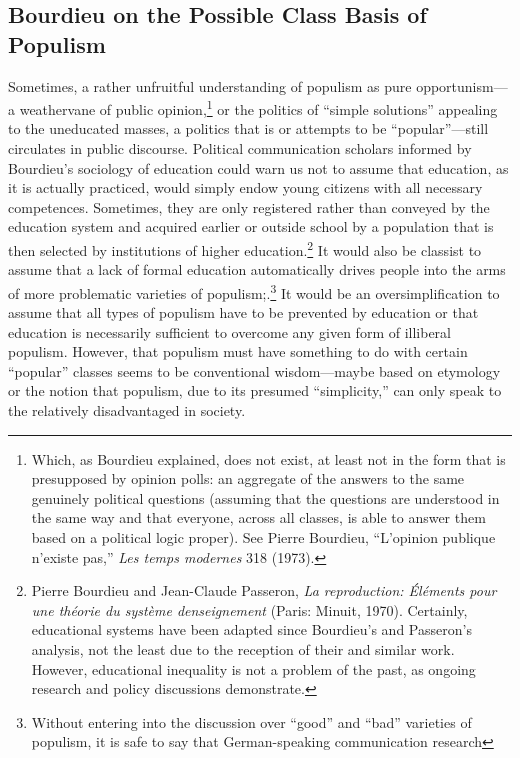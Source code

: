 \documentclass{tufte-handout}
\begin{document}
\hypertarget{bourdieu-on-the-possible-class-basis-of-populism}{%
\subsection{Bourdieu on the Possible Class
Basis of
Populism}\label{bourdieu-on-the-possible-class-basis-of-populism}}

Sometimes, a rather unfruitful understanding of populism as pure
opportunism---a weathervane of public opinion,\footnote{Which, as
  Bourdieu explained, does not exist, at least not in the form that is
  presupposed by opinion polls: an aggregate of the answers to the same
  genuinely political questions (assuming that the questions are
  understood in the same way and that everyone, across all classes, is
  able to answer them based on a political logic proper). See Pierre
  Bourdieu, ``L'opinion publique n'existe pas,'' \emph{Les temps
  modernes} 318 (1973).} or the politics of ``simple solutions''
appealing to the uneducated masses, a politics that is or attempts to be
``popular''---still circulates in public discourse. Political
communication scholars informed by Bourdieu's sociology of education
could warn us not to assume that education, as it is actually practiced,
would simply endow young citizens with all necessary competences.
Sometimes, they are only registered rather than conveyed by the
education system and acquired earlier or outside school by a population
that is then selected by institutions of higher education.\footnote{Pierre
  Bourdieu and Jean-Claude Passeron, \emph{La reproduction: Éléments
  pour une théorie du système d\textquotesingle enseignement} (Paris:
  Minuit, 1970). Certainly, educational systems have been adapted since
  Bourdieu's and Passeron's analysis, not the least due to the reception
  of their and similar work. However, educational inequality is not a
  problem of the past, as ongoing research and policy discussions
  demonstrate.} It would also be classist to assume that a lack of
formal education automatically drives people into the arms of more
problematic varieties of populism;.\footnote{Without entering into the
  discussion over ``good'' and ``bad'' varieties of populism, it is safe
  to say that German-speaking communication research} It would be an oversimplification to assume
that all types of populism have to be prevented by education or that
education is necessarily sufficient to overcome any given form of
illiberal populism. However, that populism must have something to do
with certain ``popular'' classes seems to be conventional wisdom---maybe
based on etymology or the notion that populism, due to its presumed
``simplicity,'' can only speak to the relatively disadvantaged in
society.
\end{document}
